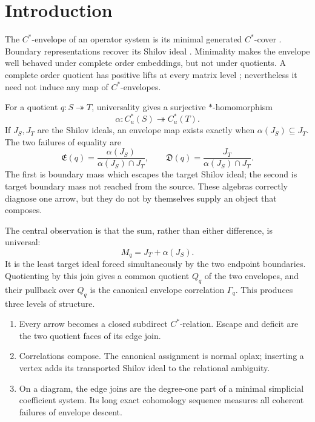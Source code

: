 \documentclass[11pt,a4paper]{amsart}
\theoremstyle{plain}
\theoremstyle{definition}
\newcommand{\Cu}{C_u^*}
\newcommand{\Esc}{\mathfrak E}
\newcommand{\Def}{\mathfrak D}
\begin{document}
\maketitle

\section{Introduction}\label{sec:intro}

The $C^*$-envelope of an operator system is its minimal generated $C^*$-cover
\cite{Hamana1979,Paulsen2002}.  Boundary representations recover its Shilov ideal
\cite{Arveson1969,Arveson2008,DritschelMcCullough2005}.  Minimality makes the envelope
well behaved under complete order embeddings, but not under quotients.  A complete order
quotient has positive lifts at every matrix level \cite{Han2011,KPTT2013}; nevertheless it need
not induce any map of $C^*$-envelopes.

For a quotient $q:S\twoheadrightarrow T$, universality gives a surjective $*$-homomorphism
\[
 \alpha:\Cu(S)\twoheadrightarrow\Cu(T).
\]
If $J_S,J_T$ are the Shilov ideals, an envelope map exists exactly when
\(\alpha(J_S)\subseteq J_T\).  The two failures of equality are
\[
 \Esc(q)=\frac{\alpha(J_S)}{\alpha(J_S)\cap J_T},
 \qquad
 \Def(q)=\frac{J_T}{\alpha(J_S)\cap J_T}.
\]
The first is boundary mass which escapes the target Shilov ideal; the second is target boundary
mass not reached from the source.  These algebras correctly diagnose one arrow, but they do not
by themselves supply an object that composes.

The central observation is that the sum, rather than either difference, is universal:
\[
 M_q=J_T+\alpha(J_S).
\]
It is the least target ideal forced simultaneously by the two endpoint boundaries.  Quotienting
by this join gives a common quotient $Q_q$ of the two envelopes, and their pullback over $Q_q$ is
the canonical envelope correlation $\Gamma_q$.  This produces three levels of structure.

\begin{enumerate}[label=\textup{(\roman*)}]
\item Every arrow becomes a closed subdirect $C^*$-relation.  Escape and deficit are the two
      quotient faces of its edge join.
\item Correlations compose.  The canonical assignment is normal oplax; inserting a vertex adds
      its transported Shilov ideal to the relational ambiguity.
\item On a diagram, the edge joins are the degree-one part of a minimal simplicial coefficient
      system.  Its long exact cohomology sequence measures all coherent failures of envelope
      descent.
\end{enumerate}
\end{document}

